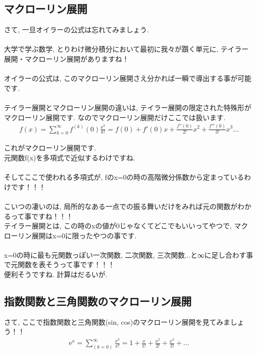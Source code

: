 \documentclass[11pt,a4paper]{jreport}
\begin{document}
\subsection{マクローリン展開}
さて, 一旦オイラーの公式は忘れてみましょう.\\
\\
大学で学ぶ数学, とりわけ微分積分において最初に我々が躓く単元に, テイラー展開・マクローリン展開がありますね！\\
\\
オイラーの公式は, このマクローリン展開さえ分かれば一瞬で導出する事が可能です.\\
\\
テイラー展開とマクローリン展開の違いは, テイラー展開の限定された特殊形がマクローリン展開です. なのでマクローリン展開だけここでは扱います.\\
\begin{eqnarray}
f(x) = \sum_{k=0}^\infty f^{(k)} (0) \frac{x^k}{k!} = f(0) + f'(0)x + \frac{f''(0)}{2!}x^2 + \frac{f'''(0)}{3!}x^3 ...
\end{eqnarray}

これがマクローリン展開です.\\
元関数f(x)を多項式で近似するわけですね.\\
\\
そしてここで使われる多項式が, fのx=0の時の高階微分係数から定まっているわけです！！！\\
\\
こいつの凄いのは, 局所的なある一点での振る舞いだけをみれば元の関数がわかるって事ですね！！！\\
テイラー展開とは, この時のxの値が0じゃなくてどこでもいいってやつで, マクローリン展開はx=0に限ったやつの事です.\\
\\
x=0の時に最も元関数っぽい一次関数, 二次関数, 三次関数...と∞に足し合わす事で元関数を表そうって事です！！！\\
便利そうですね. 計算はだるいが.\\
\subsection{指数関数と三角関数のマクローリン展開}
さて, ここで指数関数と三角関数(sin, cos)のマクローリン展開を見てみましょう！！\\

\begin{eqnarray}
\mathrm{e}^x = \sum_{(k=0)}^\infty \frac{x^k}{x!} = 1 + \frac{x}{1!} + \frac{x^2}{2!} + \frac{x^3}{3!} + ...
\label{eq:sisuu}
\end{eqnarray}
\end{document}
